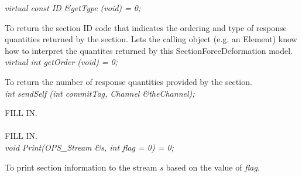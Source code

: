 {\em virtual const ID \&getType (void) = 0; } 

To return the section ID code that indicates the ordering and type of
response quantities returned by the section. Lets the calling object
(e.g. an Element) know how to interpret the quantites returned by this
SectionForceDeformation model. \\

{\em virtual int getOrder (void) = 0; } 

To return the number of response quantities provided by the section. \\

{\em    int sendSelf (int commitTag, Channel \&theChannel); }

FILL IN. \\

\\
FILL IN. \\

{\em    void Print(OPS_Stream \&s, int flag = 0) = 0;} 

To print section information to the stream {\em s} based on the value of {\em flag}. \\
